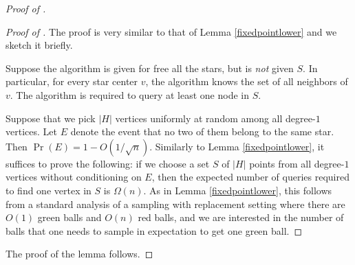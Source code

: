 \documentclass[11pt]{article}
\numberwithin{equation}{section}
\newcommand{\1}{\mathbf{1}}
\begin{document}
\begin{proof}[Proof of ]
\begin{proof} [Proof of ]
The proof is very similar to that of Lemma \ref{fixedpointlower} and we sketch it briefly.

 Suppose the algorithm is given for free all the stars, but is \emph{not} given $S$. In particular, for every star center $v$, the algorithm knows the set of all neighbors of $v$. The algorithm is required to query at least one node in $S$.
 
 Suppose that we pick $|H|$ vertices uniformly at random among all degree-$1$ vertices. Let $E$ denote the event that no two of them belong to the same star. Then $\Pr(E) = 1 - O(1/\sqrt{n})$. Similarly to Lemma \ref{fixedpointlower}, it suffices to prove the following: if we choose a set $S$ of $|H|$ points from all degree-$1$ vertices without conditioning on $E$, then the expected number of queries required to find one vertex in $S$ is $\Omega(n)$. As in Lemma \ref{fixedpointlower}, this follows from a standard analysis of a sampling with replacement setting where there are $O(1)$ green balls and $O(n)$ red balls, and we are interested in the number of balls that one needs to sample in expectation to get one green ball. 
\end{proof}

The proof of the lemma follows.
\end{proof}
\end{document}
